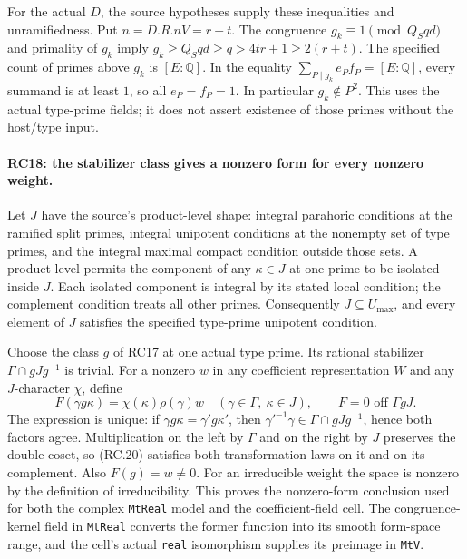 For the actual $D$, the source hypotheses supply these inequalities
and unramifiedness. Put $n=D.R.nV=r+t$.
The congruence $g_k\equiv1\pmod{Q_Sqd}$ and primality of $g_k$ imply
$g_k\ge Q_Sqd\ge q>4tr+1\ge2(r+t)$.
The specified count of primes above $g_k$ is $[E:\mathbb Q]$.
In the equality $\sum_{P\mid g_k}e_Pf_P=[E:\mathbb Q]$, every summand
is at least $1$, so all $e_P=f_P=1$. In particular $g_k\notin P^2$.
This uses the actual type-prime fields; it does not assert existence
of those primes without the host/type input.

\paragraph{RC18: the stabilizer class gives a nonzero form for every nonzero weight.}
Let $J$ have the source's product-level shape: integral parahoric
conditions at the ramified split primes, integral unipotent conditions
at the nonempty set of type primes, and the integral maximal compact
condition outside those sets. A product level permits the component
of any $\kappa\in J$ at one prime to be isolated inside $J$.
Each isolated component is integral by its stated local condition;
the complement condition treats all other primes. Consequently
$J\subseteq U_{\max}$, and every element of $J$ satisfies the specified
type-prime unipotent condition.

Choose the class $g$ of RC17 at one actual type prime. Its rational
stabilizer $\Gamma\cap gJg^{-1}$ is trivial.
For a nonzero $w$ in any coefficient representation $W$ and any
$J$-character $\chi$, define
\[
 F(\gamma g\kappa)=\chi(\kappa)\rho(\gamma)w
       \quad(\gamma\in\Gamma,\ \kappa\in J),
 \qquad F=0\text{ off }\Gamma gJ.                        \tag{RC.20}
\]
The expression is unique: if
$\gamma g\kappa=\gamma' g\kappa'$, then
$\gamma'^{-1}\gamma\in\Gamma\cap gJg^{-1}$, hence both factors agree.
Multiplication on the left by $\Gamma$ and on the right by $J$
preserves the double coset, so (RC.20) satisfies both transformation
laws on it and on its complement. Also $F(g)=w\ne0$.
For an irreducible weight the space is nonzero by the definition of
irreducibility. This proves the nonzero-form conclusion used for both
the complex \texttt{MtReal} model and the coefficient-field cell.
The congruence-kernel field in \texttt{MtReal} converts the former
function into its smooth form-space range, and the cell's actual
\texttt{real} isomorphism supplies its preimage in \texttt{MtV}.

